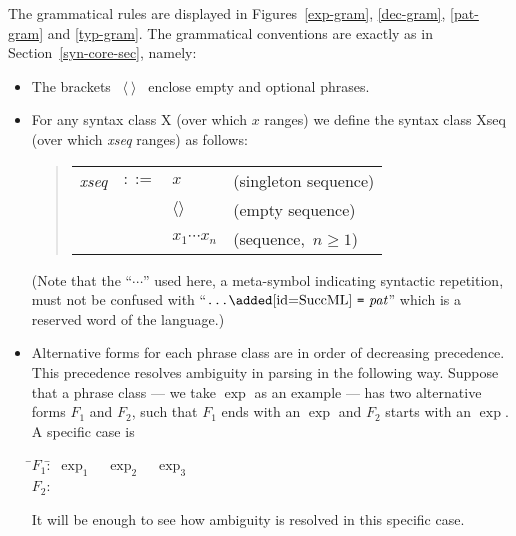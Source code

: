 The grammatical rules are displayed in Figures~\ref{exp-gram},
\ref{dec-gram}, \ref{pat-gram} and \ref{typ-gram}.
The grammatical conventions are exactly as in
Section~\ref{syn-core-sec}, namely:
\begin{itemize}
  \item The brackets ~$\langle\ \rangle$~ enclose empty and optional phrases.
  \item For any syntax class X (over which $x$ ranges)
we define the syntax class Xseq (over which {\it xseq} ranges) as follows:
    \begin{quote}
    \begin{tabular}{rcll}
       {\it xseq} & $::=$ & $x$ & (singleton sequence)\\
                  &       & $\langle \rangle$ & (empty sequence)\\
                  &       & \ml{(}$x_1$\ml{,}$\cdots$\ml{,}$x_n$\ml{)}
                                & (sequence,~$n\geq 1$) \\
    \end{tabular}
    \end{quote}
(Note that the ``$\cdots$'' used here, a meta-symbol indicating syntactic
repetition, must not be
confused with ``$\wildrec$'' which is a reserved word of the language.)
  \item Alternative forms for each phrase class are in order of decreasing
        precedence. This precedence resolves ambiguity in parsing in
the following way. Suppose that a phrase class --- we take $\exp$ as
an example --- has two alternative forms $F_1$ and $F_2$, such that $F_1$ ends
with an $\exp$ and $F_2$ starts with an $\exp$. A specific case is
\begin{tabbing}
\qquad\=$F_1$:\quad\=\IF\ $\exp_1$\ \THEN\ $\exp_2$\ \ELSE\ $\exp_3$\+\\
        $F_2$:     \>\handlexp
\end{tabbing}
It will be enough to see how ambiguity is resolved in this specific case.


\end{itemize}
